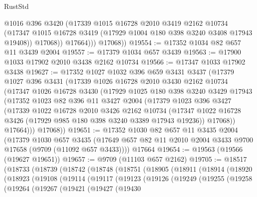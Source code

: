 \begin{lexlean}{RustStd}
\begin{coremodule}
                @1016
                @396
                @3420
                (@17339
                  @1015
                  @16728
                  @2010
                  @3419
                  @2162
                  @10734
                  (@17347 @1015 @16728 @3419 (@17929 @1004 @180 @398 @3240 @3408 @17943 @19408))
                  @17068))
              @17664)))
        @17068))
@19554 := @17352 @1034 @82 @657 @11 @3439 @2004
@19557 := @17379 @1034 @657 @3439
@19563 := @17900 @1033 @17902 @2010 @3438 @2162 @10734
@19566 := @17347 @1033 @17902 @3438
@19627 := @17352
    @1027
    @1032
    @396
    @659
    @3431
    @3437
    (@17379
      @1027
      @396
      @3431
      (@17339
        @1026
        @16728
        @2010
        @3430
        @2162
        @10734
        (@17347
          @1026
          @16728
          @3430
          (@17929
            @1025
            @180
            @398
            @3240
            @3429
            @17943
            (@17352
              @1023
              @82
              @396
              @11
              @3427
              @2004
              (@17379
                @1023
                @396
                @3427
                (@17339
                  @1022
                  @16728
                  @2010
                  @3426
                  @2162
                  @10734
                  (@17347 @1022 @16728 @3426 (@17929 @985 @180 @398 @3240 @3389 @17943 @19236))
                  @17068))
              @17664)))
        @17068))
@19651 := @17352
    @1030
    @82
    @657
    @11
    @3435
    @2004
    (@17379
      @1030
      @657
      @3435
      (@17649 @657 @82 @11 @2010 @2004 @3433 @9700 @17658 (@9709 (@11092 @657 @3433))))
    @17664
@19654 := @19563 (@19566 (@19627 @19651))
@19657 := @9709 (@11103 @657 @2162)
@19705 := @18517
    (@18733
      (@18739
        (@18742
          (@18748
            (@18751
              (@18905
                (@18911
                  (@18914
                    (@18920
                      (@18923
                        (@19108
                          (@19114
                            (@19117
                              (@19123
                                (@19126
                                  (@19249
                                    (@19255
                                      (@19258
                                        (@19264
                                          (@19267
                                            (@19421
                                              (@19427
                                                (@19430

\end{coremodule}
\end{lexlean}
